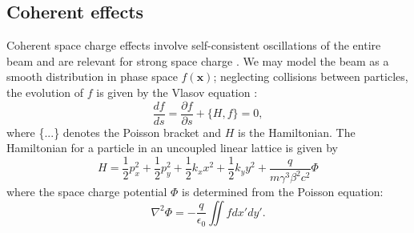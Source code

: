 \subsection{Coherent effects}

Coherent space charge effects involve self-consistent oscillations of the entire beam and are relevant for strong space charge \cite{book:Reiser, Wangler2008, Cousineau2003}. We may model the beam as a smooth distribution in phase space $f(\mathbf{x})$; neglecting collisions between particles, the evolution of $f$ is given by the Vlasov equation \cite{Vlasov1961}:
%
\begin{equation} \label{eq:Vlasov}
    \frac{df}{ds} = \frac{\partial{f}}{\partial{s}} + \{H, f\} = 0,
\end{equation}
%
where \{...\} denotes the Poisson bracket and $H$ is the Hamiltonian. The Hamiltonian for a particle in an uncoupled linear lattice is given by
%
\begin{equation}
    H = \frac{1}{2}p_x^2 + \frac{1}{2}p_y^2 + \frac{1}{2}k_{x}x^2 + \frac{1}{2}k_{y}y^2 + \frac{q}{m\gamma^3\beta^2c^2}\Phi
\end{equation}
%
where the space charge potential $\Phi$ is determined from the Poisson equation:
%
\begin{equation} \label{eq:Poisson}
    \nabla^2 \Phi = -\frac{q}{\epsilon_0}\iint{f}dx'dy'.
\end{equation}
%

